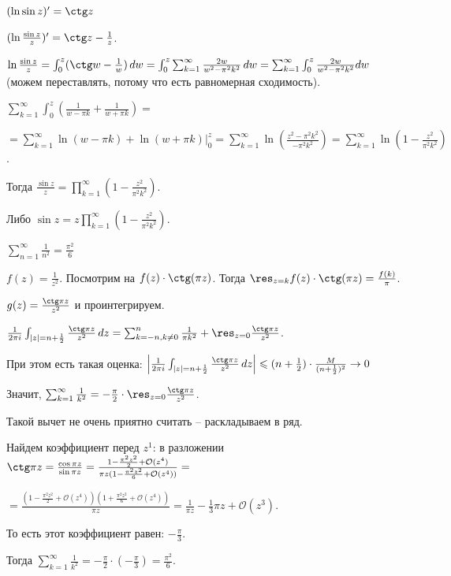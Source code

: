 \begin{example}
    $(\ln \sin z)' = \ctg z$

    $(\ln \frac{\sin z}{z})' = \ctg z - \frac{1}{z}$.

    $\ln \frac{\sin z}{z} = \int_{0}^{z} (\ctg w - \frac{1}{w}) \, dw = \int_{0}^{z} \sum_{k=1}^{\infty} \frac{2w}{w^2 - \pi^2 k^2} \, dw = 
    \sum_{k = 1}^{\infty} \int_{0}^{z} {\frac{2w}{w^2 - \pi^2 k^2} dw}$ (можем переставлять, потому что есть равномерная сходимость).
    
    $\sum_{k = 1}^{\infty} \int_{0}^{z} \left ( \frac{1}{w - \pi k} + \frac{1}{w + \pi k} \right ) =$

    $= \sum_{k = 1}^{\infty} \ln (w - \pi k) + \ln (w + \pi k) \bigg |_{0}^z = \sum_{k = 1}^{\infty} \ln 
    \left ( \frac{z^2 - \pi^2 k^2}{-\pi^2 k^2} \right ) = \sum_{k = 1}^{\infty} \ln \left ( 1 - \frac{z^2}{\pi^2 k^2} \right )$.

    Тогда $\frac{\sin z}{z} = \prod_{k = 1}^{\infty} \left(1 - \frac{z^2}{\pi^2 k^2} \right)$.
    
    Либо $\sin z = z \prod_{k = 1}^{\infty} \left(1 - \frac{z^2}{\pi^2 k^2} \right)$.
\end{example}

\begin{example}
    $\sum_{n = 1}^{\infty} \frac{1}{n^2} = \frac{\pi^2}{6}$

    $f(z) = \frac{1}{z^2}$. Посмотрим на $f(z) \cdot \ctg (\pi z)$. Тогда
    $\res_{z = k} f(z) \cdot \ctg (\pi z) = \frac{f(k)}{\pi}$.

    $g(z) = \frac{\ctg \pi z}{z^2}$ и проинтегрируем.

    $\frac{1}{2 \pi i} \int_{|z| = n + \frac{1}{2}} \frac{\ctg \pi z}{z^2} \, dz = 
    \sum_{k = -n, k \neq 0}^n \frac{1}{\pi k^2} + \res_{z = 0} \frac{\ctg \pi z}{z^2}$.

    При этом есть такая оценка:
    $\left | \frac{1}{2 \pi i} \int_{|z| = n + \frac{1}{2}} \frac{\ctg \pi z}{z^2} \, dz \right | \leqslant 
    (n + \frac{1}{2}) \cdot \frac{M}{(n + \frac{1}{2})^2} \rightarrow 0$

    Значит, $\sum_{k = 1}^{\infty} \frac{1}{k^2} = -\frac{\pi}{2} \cdot \res_{z = 0} \frac{\ctg \pi z}{z^2}$.
    
    Такой вычет не очень приятно считать -- раскладываем в ряд.

    Найдем коэффициент перед $z^1$: в разложении $\ctg \pi z = \frac{\cos \pi z}{\sin \pi z} = \frac{1 - \frac{\pi^2 z^2}{2} + \mathcal{O}(z^4)}{\pi z (1 - \frac{\pi^2 z^2}{6} + \mathcal{O}(z^4))} = $


    $ = \frac{(1 - \frac{\pi^2 z^2}{2} + \mathcal{O}(z^4))(1 + \frac{\pi^2 z^2}{6} + \mathcal{O}(z^4))}{\pi z} = \frac{1}{\pi z} - \frac{1}{3} \pi z + \mathcal{O}(z^3)$.

    То есть этот коэффициент равен: $-\frac{\pi}{3}$.

    Тогда $\sum_{k = 1}^{\infty} \frac{1}{k^2} = -\frac{\pi}{2} \cdot (-\frac{\pi}{3}) = \frac{\pi^2}{6}$.
\end{example}


